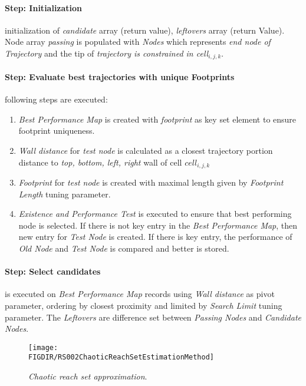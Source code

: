 \paragraph{Step: Initialization} initialization of \emph{candidate} array (return value), \emph{leftovers} array (return Value). Node array \emph{passing} is populated with \emph{Nodes} which represents \emph{end node of Trajectory} and the tip of \emph{trajectory is constrained in \emph{cell}$_{i,j,k}$}.

\paragraph{Step: Evaluate best trajectories with unique Footprints} following steps are executed:
\begin{enumerate}
    \item \emph{Best Performance Map} is created with \emph{footprint} as key set element to ensure footprint uniqueness.
    \item \emph{Wall distance} for \emph{test node} is calculated as a closest trajectory portion distance to \emph{top, bottom, left, right} wall of cell $cell_{i,j,k}$
    \item \emph{Footprint} for \emph{test node} is created with maximal length given by \emph{Footprint Length} tuning parameter.
    \item \emph{Existence and Performance Test} is executed to ensure that best performing node is selected. If there is not key entry in the \emph{Best Performance Map}, then new entry for \emph{Test Node} is created. If there is key entry, the performance of \emph{Old Node} and \emph{Test Node} is compared and better is stored.
\end{enumerate}

\paragraph{Step: Select candidates} is executed on \emph{Best Performance Map} records using  \emph{Wall distance} as pivot parameter, ordering by closest proximity and limited by \emph{Search Limit} tuning parameter. The \emph{Leftovers} are difference set between \emph{Passing Nodes} and \emph{Candidate Nodes}. 

\begin{figure}[H]
    \centering
    \texttt{[image: \\FIGDIR/RS002ChaoticReachSetEstimationMethod]} 
    \caption{\emph{Chaotic \emph{reach set} approximation}.}
    \label{fig:chaoticReachSetApproximation}
\end{figure}

